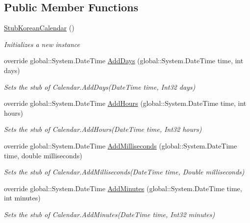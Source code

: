 \subsection*{Public Member Functions}
\begin{DoxyCompactItemize}
\item 
\hyperlink{class_system_1_1_globalization_1_1_fakes_1_1_stub_korean_calendar_a700c566329f509b9dc3434dd27b93b8b}{Stub\-Korean\-Calendar} ()
\begin{DoxyCompactList}\small\item\em Initializes a new instance\end{DoxyCompactList}\item 
override global\-::\-System.\-Date\-Time \hyperlink{class_system_1_1_globalization_1_1_fakes_1_1_stub_korean_calendar_ab028dc3062ced8223fbce95d303de82f}{Add\-Days} (global\-::\-System.\-Date\-Time time, int days)
\begin{DoxyCompactList}\small\item\em Sets the stub of Calendar.\-Add\-Days(\-Date\-Time time, Int32 days)\end{DoxyCompactList}\item 
override global\-::\-System.\-Date\-Time \hyperlink{class_system_1_1_globalization_1_1_fakes_1_1_stub_korean_calendar_a168cc1785ea56a05caf9587ca46ee3a9}{Add\-Hours} (global\-::\-System.\-Date\-Time time, int hours)
\begin{DoxyCompactList}\small\item\em Sets the stub of Calendar.\-Add\-Hours(\-Date\-Time time, Int32 hours)\end{DoxyCompactList}\item 
override global\-::\-System.\-Date\-Time \hyperlink{class_system_1_1_globalization_1_1_fakes_1_1_stub_korean_calendar_a72bb47d3baddb7363a279bddc0c6d69c}{Add\-Milliseconds} (global\-::\-System.\-Date\-Time time, double milliseconds)
\begin{DoxyCompactList}\small\item\em Sets the stub of Calendar.\-Add\-Milliseconds(\-Date\-Time time, Double milliseconds)\end{DoxyCompactList}\item 
override global\-::\-System.\-Date\-Time \hyperlink{class_system_1_1_globalization_1_1_fakes_1_1_stub_korean_calendar_a34f2888a7e753eb086d70deead982305}{Add\-Minutes} (global\-::\-System.\-Date\-Time time, int minutes)
\begin{DoxyCompactList}\small\item\em Sets the stub of Calendar.\-Add\-Minutes(\-Date\-Time time, Int32 minutes)\end{DoxyCompactList}\item 

\end{DoxyCompactItemize}
